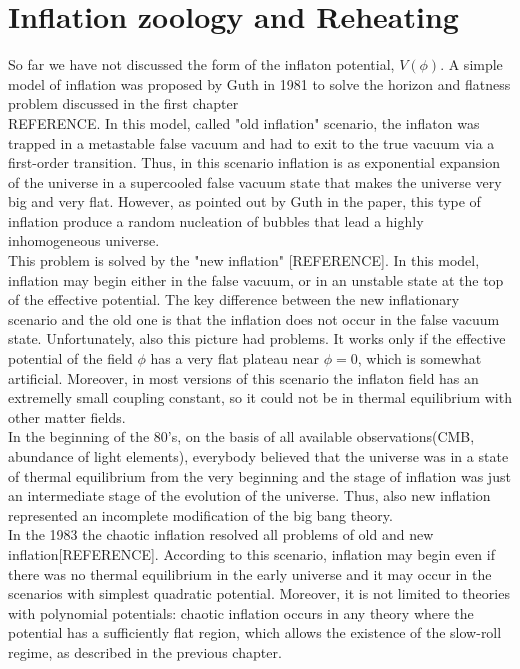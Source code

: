 \documentclass[11pt,a4paper,twoside]{book}
\begin{document}
\chapter{Inflation zoology and Reheating}
So far we have not discussed the form of the inflaton potential, $ V(\phi) $. A simple model of inflation was proposed by Guth in 1981 to solve the horizon and flatness problem discussed in the first chapter\\REFERENCE.
In this model, called "old inflation" scenario, the inflaton was trapped in a metastable false vacuum and had to exit to the true vacuum via a first-order transition. Thus, in this scenario inflation is as exponential expansion of the universe in a supercooled false vacuum state that makes the universe very big and very flat. However, as pointed out by Guth in the paper, this type of inflation produce a random nucleation of bubbles that lead a highly inhomogeneous universe.\\
This problem is solved by the "new inflation" [REFERENCE]. In this model, inflation may begin either in the false vacuum, or in an unstable state at the top of the effective potential. The key difference between the new inflationary scenario and the old one is that the inflation does not occur in the false vacuum state. Unfortunately, also this picture had problems. It works only if the effective potential of the field $ \phi $ has a very flat plateau near $\phi=0$, which is somewhat artificial. Moreover, in most versions of this scenario the inflaton field  has an extremelly small coupling constant, so it could not be in thermal equilibrium  with other matter fields.\\
In the beginning of the 80's, on the basis of all available observations(CMB, abundance of light elements), everybody believed that the universe was in a state of thermal equilibrium from the very beginning and the stage of inflation was just an intermediate stage of the evolution of the universe. Thus, also new inflation represented an incomplete modification of the big bang theory.\\
In the 1983 the chaotic inflation resolved all problems of old and new inflation[REFERENCE]. According to this scenario, inflation may begin even if there was no thermal equilibrium in the early universe and it may occur in the scenarios with simplest quadratic potential. Moreover, it is not limited to theories with polynomial potentials: chaotic inflation occurs in any theory where the potential has a sufficiently flat region, which allows the existence of the slow-roll regime, as described in the previous chapter. \\
\end{document}
